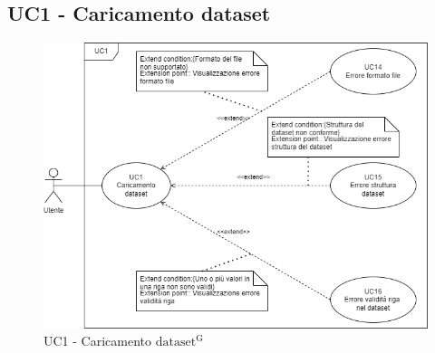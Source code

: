 \subsection{UC1 - Caricamento dataset}
\begin{figure}[h!]
    \centering
    \includegraphics[scale=0.60]{../../assets/Caricamento_dataset.png}
    \caption{UC1 - Caricamento ${\mathrm{dataset^{G}}}$}
\end{figure}
